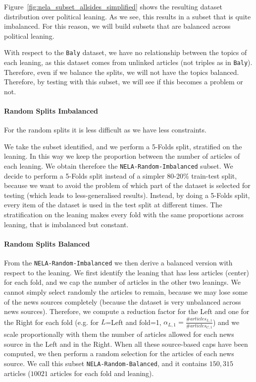 Figure~\ref{fig:nela_subset_allsides_simplified} shows the resulting dataset distribution over political leaning. As we see, this results in a subset that is quite imbalanced. For this reason, we will build subsets that are balanced across political leaning.

With respect to the \texttt{Baly} dataset, we have no relationship between the topics of each leaning, as this dataset comes from unlinked articles (not triples as in \texttt{Baly}). Therefore, even if we balance the splits, we will not have the topics balanced.
Therefore, by testing with this subset, we will see if this becomes a problem or not.

\paragraph{Random Splits Imbalanced}

For the random splits it is less difficult as we have less constraints.

We take the subset identified, and we perform a 5-Folds split, stratified on the leaning. In this way we keep the proportion between the number of articles of each leaning. We obtain therefore the \texttt{NELA-Random-Imbalanced} subset.
We decide to perform a 5-Folds split instead of a simpler 80-20\% train-test split, because we want to avoid the problem of which part of the dataset is selected for testing (which leads to less-generalised results).
Instead, by doing a 5-Folds split, every item of the dataset is used in the test split at different times.
The stratification on the leaning makes every fold with the same proportions across leaning, that is imbalanced but constant.

\paragraph{Random Splits Balanced}

From the \texttt{NELA-Random-Imbalanced} we then derive a balanced version with respect to the leaning. We first identify the leaning that has less articles (center) for each fold, and we cap the number of articles in the other two leanings.
We cannot simply select randomly the articles to remain, because we may lose some of the news sources completely (because the dataset is very unbalanced across news sources).
Therefore, we compute a reduction factor for the Left and one for the Right for each fold (e.g. for $L$=Left and fold=1, $\alpha_{L,1} = \frac{\#articles_{L,1}}{\#articles_{C,1}}$) and we scale proportionally with them the number of articles allowed for each news source in the Left and in the Right. When all these source-based caps have been computed, we then perform a random selection for the articles of each news source.  
We call this subset \texttt{NELA-Random-Balanced}, and it contains $150,315$ articles ($10021$ articles for each fold and leaning).

